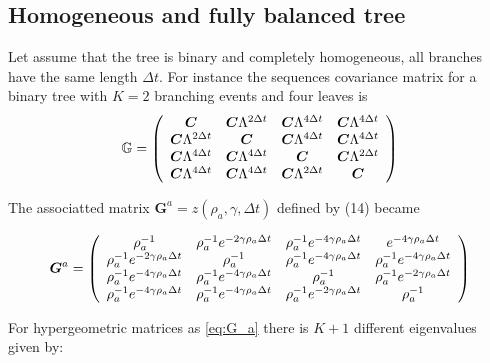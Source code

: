\documentclass[preprint,amsmath,amssymb,superscriptaddress,showpacs,pre]{revtex4-1}
\let\originalleft\left
\let\originalright\right
\renewcommand{\left}{\mathopen{}\mathclose\bgroup\originalleft}
\renewcommand{\right}{\aftergroup\egroup\originalright}
\begin{document}
 \subsection{ Homogeneous and fully balanced tree }

Let assume that the tree is binary and completely homogeneous, all branches have the same length $\Delta t$. For instance the sequences covariance matrix for a binary tree with $K=2$ branching events and four leaves is
\begin{equation} 
\mathbb{G} =  \left(
\begin{array}{cccc}
{ \bm C} & {\bm C} \Lambda ^{2\Delta t} & {\bm C} \Lambda ^{4\Delta t} & {\bm C} \Lambda ^{4\Delta t} \\
{\bm C} \Lambda ^{2\Delta t} & {\bm C} & {\bm C} \Lambda ^{4\Delta t} & {\bm C} \Lambda ^{4\Delta t} \\
{\bm C} \Lambda ^{4\Delta t} & {\bm C} \Lambda ^{4\Delta t} & {\bm C} & {\bm C} \Lambda ^{2\Delta t} \\
{\bm C} \Lambda ^{4\Delta t} & {\bm C} \Lambda ^{4\Delta t} & {\bm C} \Lambda ^{2\Delta t} & {\bm C} \\
\end{array}\label{eq:G}
\right)
\end{equation}

The associatted matrix $\bm G^a=z(\rho_a,\gamma,\Delta t)$ defined by (14) became

\begin{equation} 
\bm G^a =  \left(
\begin{array}{cccc}
{  \rho^{-1}_a } & {\rho^{-1}_a } e ^{-2\gamma\rho_a\Delta t} & {\rho^{-1}_a } e ^{-4\gamma\rho_a\Delta t}& {e ^{-4\gamma\rho_a\Delta t}} \\
{\rho^{-1}_a } e ^{-2\gamma\rho_a\Delta t} & {\rho^{-1}_a } & {\rho^{-1}_a } e ^{-4\gamma\rho_a\Delta t} & {\rho^{-1}_a } e ^{-4\gamma\rho_a\Delta t} \\
{\rho^{-1}_a } e ^{-4\gamma\rho_a\Delta t} & {\rho^{-1}_a} e ^{-4\gamma\rho_a\Delta t}& {\rho^{-1}_a } & {\rho^{-1}_a } e ^{-2\gamma\rho_a\Delta t}\\
{\rho^{-1}_a } e ^{-4\gamma\rho_a\Delta t} & {\rho^{-1}_a } e ^{-4\gamma\rho_a\Delta t} & {\rho^{-1}_a } e ^{-2\gamma\rho_a\Delta t} & {\rho^{-1}_a } \\
\end{array}\label{eq:G_a}
\right)
\end{equation}

For hypergeometric matrices as \ref{eq:G_a} there is $K+1$ different eigenvalues  given by: 
\end{document}
